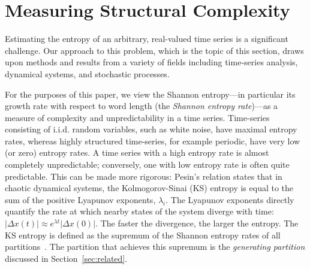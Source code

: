 \documentclass[%
pre,
reprint,
superscriptaddress,
showpacs,
nofootinbib,
nobibnotes,
 amsmath,amssymb,
 aps,
]{revtex4-1}
\newcommand{\gcc}{{\tt 403.gcc}\xspace}
\newcommand{\naive}{na\"ive}
\newcommand{\col}{{\tt col\_major}\xspace}
\begin{document}





\section{Measuring Structural Complexity }\label{sec:meaComplex}


Estimating the entropy of an arbitrary, real-valued time series is a
significant challenge.  Our approach to this problem, which is the topic of
this section, draws upon methods and results from a variety of fields
including time-series analysis, dynamical systems, and stochastic
processes.

For the purposes of this paper, we view the Shannon entropy---in
particular its growth rate with respect to word length (the
\emph{Shannon entropy rate})---as a measure of complexity and
unpredictability in a time series.  Time-series consisting of i.i.d.
random variables, such as white noise, have maximal entropy rates,
whereas highly structured time-series, for example periodic, have very
low (or zero) entropy rates. A time series with a high entropy rate is
almost completely unpredictable; conversely, one with low entropy rate
is often quite predictable. This can be made more rigorous: Pesin's
relation \cite{pesin77} states that in chaotic dynamical systems, the
Kolmogorov-Sinai (KS) entropy is equal to the sum of the positive
Lyapunov exponents, $\lambda_i$.  The Lyapunov exponents directly
quantify the rate at which nearby states of the system diverge with
time: $\left| \Delta x(t) \right| \approx e^{\lambda t} \left| \Delta
x(0) \right|$.  The faster the divergence, the larger the entropy.
The KS entropy is defined as the supremum of the Shannon entropy rates
of all partitions~\cite{petersen1989}. The partition that achieves
this supremum is the \emph{generating partition} discussed in
Section~\ref{sec:related}.
\end{document}
